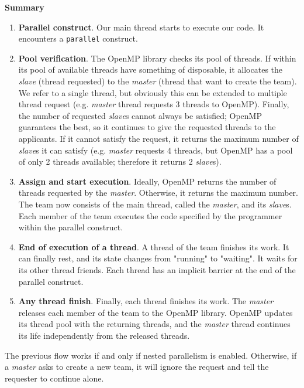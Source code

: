 \highspace
\begin{flushleft}
    \textcolor{Red2}{ \textbf{Summary}}
\end{flushleft}
\begin{enumerate}
    \item \textbf{Parallel construct}. Our main thread starts to execute our code. It encounters a \texttt{parallel} construct.
    
    \item \textbf{Pool verification}. The OpenMP library checks its pool of threads. If within its pool of available threads have something of disposable, it allocates the \emph{slave} (thread requested) to the \emph{master} (thread that want to create the team). We refer to a single thread, but obviously this can be extended to multiple thread request (e.g. \emph{master} thread requests 3 threads to OpenMP). Finally, the number of requested \emph{slave}s cannot always be satisfied; OpenMP guarantees the best, so it continues to give the requested threads to the applicants. If it cannot satisfy the request, it returns the maximum number of \emph{slave}s it can satisfy (e.g. \emph{master} requests 4 threads, but OpenMP has a pool of only 2 threads available; therefore it returns 2 \emph{slave}s).
    
    \item \textbf{Assign and start execution}. Ideally, OpenMP returns the number of threads requested by the \emph{master}. Otherwise, it returns the maximum number. The team now consists of the main thread, called the \emph{master}, and its \emph{slave}s. Each member of the team executes the code specified by the programmer within the parallel construct.
    
    \item \textbf{End of execution of a thread}. A thread of the team finishes its work. It can finally rest, and its state changes from "running" to "waiting". It waits for its other thread friends. Each thread has an implicit barrier at the end of the parallel construct.
    
    \item \textbf{Any thread finish}. Finally, each thread finishes its work. The \emph{master} releases each member of the team to the OpenMP library. OpenMP updates its thread pool with the returning threads, and the \emph{master} thread continues its life independently from the released threads.
\end{enumerate}
The previous flow works if and only if nested parallelism is enabled. Otherwise, if a \emph{master} asks to create a new team, it will ignore the request and tell the requester to continue alone.

